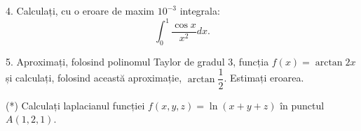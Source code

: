 \vspace{1cm}

4. Calculați, cu o eroare de maxim $ 10^{-3} $ integrala:
\[
  \int_0^1 \dfrac{\cos x}{x^2} dx.
\]

\vspace{1cm}

5. Aproximați, folosind polinomul Taylor de gradul 3,
funcția $ f(x) = \arctan 2x $ și calculați, folosind această
aproximație, $ \arctan \dfrac{1}{2} $. Estimați eroarea.

\vspace{1cm}

(*) Calculați laplacianul funcției $ f(x, y, z) = \ln(x + y + z) $
în punctul $ A(1, 2, 1) $.


